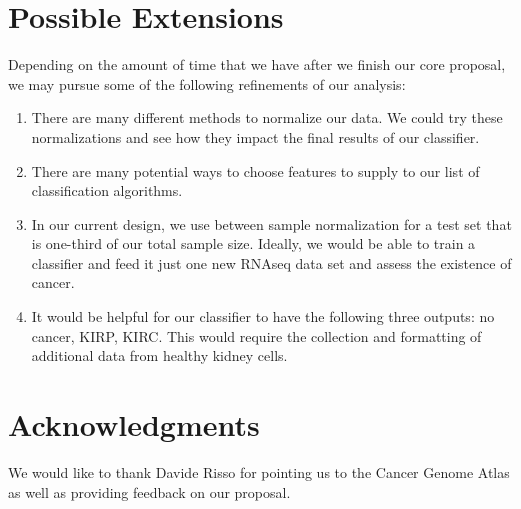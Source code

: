 \section{Possible Extensions}

Depending on the amount of time that we have after we finish our core proposal,
we may pursue some of the following refinements of our analysis:

\begin{enumerate}

\item There are many different methods to normalize our data. We could try
these normalizations and see how they impact the final results of our
classifier. 

\item There are many potential ways to choose features to supply to our list of
classification algorithms. 

\item In our current design, we use between sample normalization for a test set
that is one-third of our total sample size. Ideally, we would be able to train
a classifier and feed it just one new RNAseq data set and assess the existence
of cancer. 

\item It would be helpful for our classifier to have the following three
outputs: no cancer, KIRP, KIRC. This would require the collection and
formatting of additional data from healthy kidney cells. 

\end{enumerate}

\section*{Acknowledgments}
We would like to thank Davide Risso for pointing us to the Cancer Genome
Atlas as well as providing feedback on our proposal.


